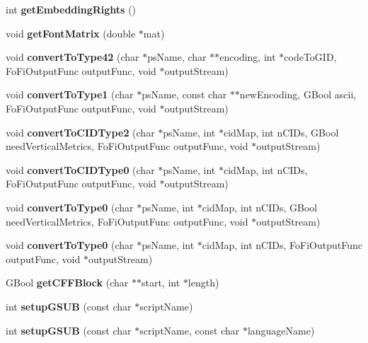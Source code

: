 \begin{DoxyCompactItemize}
int {\bfseries get\+Embedding\+Rights} ()
\item 
\mbox{\label{class_fo_fi_true_type_af31e2316d8dc4cfd7c0c9f3b2492b49e}} 
void {\bfseries get\+Font\+Matrix} (double $\ast$mat)
\item 
\mbox{\label{class_fo_fi_true_type_a3366bac8483dabc54fcda1c95108c942}} 
void {\bfseries convert\+To\+Type42} (char $\ast$ps\+Name, char $\ast$$\ast$encoding, int $\ast$code\+To\+G\+ID, Fo\+Fi\+Output\+Func output\+Func, void $\ast$output\+Stream)
\item 
\mbox{\label{class_fo_fi_true_type_ab0ec70abb47e855b3d16d0af2da24e5f}} 
void {\bfseries convert\+To\+Type1} (char $\ast$ps\+Name, const char $\ast$$\ast$new\+Encoding, G\+Bool ascii, Fo\+Fi\+Output\+Func output\+Func, void $\ast$output\+Stream)
\item 
\mbox{\label{class_fo_fi_true_type_a0c2502b6963c300dc07c4ba75b991e65}} 
void {\bfseries convert\+To\+C\+I\+D\+Type2} (char $\ast$ps\+Name, int $\ast$cid\+Map, int n\+C\+I\+Ds, G\+Bool need\+Vertical\+Metrics, Fo\+Fi\+Output\+Func output\+Func, void $\ast$output\+Stream)
\item 
\mbox{\label{class_fo_fi_true_type_aeae34d31bc50c3a357b4cd7db51db663}} 
void {\bfseries convert\+To\+C\+I\+D\+Type0} (char $\ast$ps\+Name, int $\ast$cid\+Map, int n\+C\+I\+Ds, Fo\+Fi\+Output\+Func output\+Func, void $\ast$output\+Stream)
\item 
\mbox{\label{class_fo_fi_true_type_aab59556041d5a66a26e3eb1fac8cde3e}} 
void {\bfseries convert\+To\+Type0} (char $\ast$ps\+Name, int $\ast$cid\+Map, int n\+C\+I\+Ds, G\+Bool need\+Vertical\+Metrics, Fo\+Fi\+Output\+Func output\+Func, void $\ast$output\+Stream)
\item 
\mbox{\label{class_fo_fi_true_type_ad4bd562818ab4276f5d98116fbc6f294}} 
void {\bfseries convert\+To\+Type0} (char $\ast$ps\+Name, int $\ast$cid\+Map, int n\+C\+I\+Ds, Fo\+Fi\+Output\+Func output\+Func, void $\ast$output\+Stream)
\item 
\mbox{\label{class_fo_fi_true_type_a1a9074b3be478aa726d426ab28672e5f}} 
G\+Bool {\bfseries get\+C\+F\+F\+Block} (char $\ast$$\ast$start, int $\ast$length)
\item 
\mbox{\label{class_fo_fi_true_type_a97fd6400273f760b742d60ed4fe29456}} 
int {\bfseries setup\+G\+S\+UB} (const char $\ast$script\+Name)
\item 
\mbox{\label{class_fo_fi_true_type_a079832a98b55991a6f3c6751b0b4df34}} 
int {\bfseries setup\+G\+S\+UB} (const char $\ast$script\+Name, const char $\ast$language\+Name)
\end{DoxyCompactItemize}
